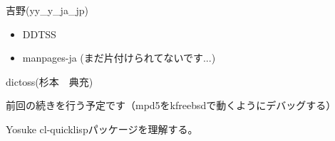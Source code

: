 \begin{prework}{ 吉野(yy\_{}y\_{}ja\_{}jp) }
\begin{itemize}
\item DDTSS
\item manpages-ja (まだ片付けられてないです...)
\end{itemize}
\end{prework}

\begin{prework}{ dictoss(杉本　典充) }

前回の続きを行う予定です（mpd5をkfreebsdで動くようにデバッグする）

\end{prework}

\begin{prework}{ Yosuke }
cl-quicklispパッケージを理解する。
\end{prework}
